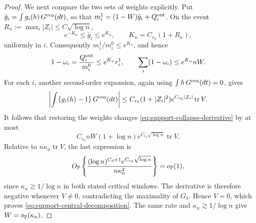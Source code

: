 \begin{proof}
We next compare the two sets of weights explicitly. Put
\(\bar g_i=\int g_i(h)\,G^{\rm cen}(dt)\), so that
\(m_i^1=(1-W)\bar g_i+Q_i^{\rm out}\). On the event
\(R_n:=\max_i|Z_i|\le C\sqrt{\log n}\),
\[
 e^{-K_n}\le \bar g_i\le e^{K_n},
 \qquad K_n=C_{r_0}(1+R_n),
\]
uniformly in \(i\). Consequently \(m_i^1/m_i^0\le e^{K_n}\), and hence
\[
 1-\omega_i=\frac{Q_i^{\rm out}}{m_i^0}
 \le e^{K_n}r_i^1,
 \qquad
 \sum_i(1-\omega_i)\le e^{K_n}nW.
\]
For each \(i\), another second-order expansion, again using
\(\int h\,G^{\rm cen}(dt)=0\), gives
\[
 \left|\int\{g_i(h)-1\}\,G^{\rm cen}(dt)\right|
 \le C_{r_0}(1+|Z_i|^2)e^{C_{r_0}|Z_i|}\operatorname{tr}V.
\]
It follows that restoring the weights changes
\eqref{eq:support-collapse-derivative} by at most
\[
 C_{r_0}nW(1+\log n)e^{C_{r_0}\sqrt{\log n}}\operatorname{tr}V.
\]
Relative to \(n\kappa_n\operatorname{tr}V\), the last expression is
\[
 O_{\mathbb P}\left\{
   \frac{(\log n)^{C_d+1}e^{C_{r_0}\sqrt{\log n}}}
        {n\kappa_n^2}
 \right\}=o_{\mathbb P}(1),
\]
since \(\kappa_n\gtrsim1/\log n\) in both stated critical windows. The
derivative is therefore negative whenever \(V\ne0\), contradicting the
maximality of \(G_1\). Hence \(V=0\), which proves
\eqref{eq:support-central-decomposition}. The same rate and
\(\kappa_n\gtrsim1/\log n\) give \(W=o_{\mathbb P}(\kappa_n)\).
\end{proof}
